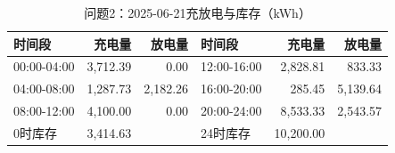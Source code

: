 \begin{table}[H]\centering\small\caption{问题2：2025-06-21充放电与库存（kWh）}\label{tab:q220250621b}
\begin{tabular}{lrrlrr}\toprule
时间段 & 充电量 & 放电量 & 时间段 & 充电量 & 放电量\\\midrule
00:00-04:00 & 3,712.39 & 0.00 & 12:00-16:00 & 2,828.81 & 833.33\\
04:00-08:00 & 1,287.73 & 2,182.26 & 16:00-20:00 & 285.45 & 5,139.64\\
08:00-12:00 & 4,100.00 & 0.00 & 20:00-24:00 & 8,533.33 & 2,543.57\\
0时库存 & 3,414.63 &  & 24时库存 & 10,200.00 & \\
\bottomrule\end{tabular}\end{table}
